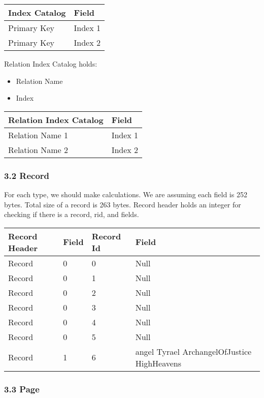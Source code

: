 \documentclass[
]{article}
\begin{document}
\begin{longtable}[]{@{}ll@{}}
\toprule
Index Catalog & Field \\
\midrule
\endhead
Primary Key & Index 1 \\
Primary Key & Index 2 \\
\bottomrule
\end{longtable}

Relation Index Catalog holds:

\begin{itemize}
\item
  Relation Name
\item
  Index
\end{itemize}

\begin{longtable}[]{@{}ll@{}}
\toprule
Relation Index Catalog & Field \\
\midrule
\endhead
Relation Name 1 & Index 1 \\
Relation Name 2 & Index 2 \\
\bottomrule
\end{longtable}

\hypertarget{record}{%
\subsubsection{3.2 Record}\label{record}}

For each type, we should make calculations. We are assuming each field
is 252 bytes. Total size of a record is 263 bytes. Record header holds
an integer for checking if there is a record, rid, and fields.

\begin{longtable}[]{@{}llll@{}}
\toprule
Record Header & Field & Record Id & Field \\
\midrule
\endhead
Record & 0 & 0 & Null \\
Record & 0 & 1 & Null \\
Record & 0 & 2 & Null \\
Record & 0 & 3 & Null \\
Record & 0 & 4 & Null \\
Record & 0 & 5 & Null \\
Record & 1 & 6 & angel Tyrael ArchangelOfJustice HighHeavens \\
\bottomrule
\end{longtable}

\hypertarget{page}{%
\subsubsection{3.3 Page}\label{page}}
\end{document}
